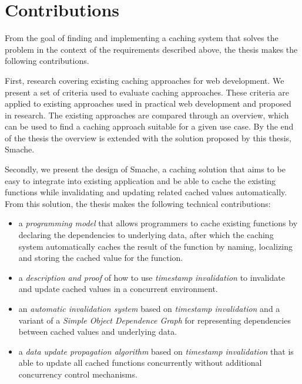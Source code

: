 

\section{Contributions}
\label{sec:contributions}

From the goal of finding and implementing a caching system that solves the problem in the context of the requirements described above, the thesis makes the following contributions.

First, research covering existing caching approaches for web development. We present a set of criteria used to evaluate caching approaches. These criteria are applied to existing approaches used in practical web development and proposed in research. The existing approaches are compared through an overview, which can be used to find a caching approach suitable for a given use case. By the end of the thesis the overview is extended with the solution proposed by this thesis, Smache.

Secondly, we present the design of Smache, a caching solution that aims to be easy to integrate into existing application and be able to cache the existing functions while invalidating and updating related cached values automatically. From this solution, the thesis makes the following technical contributions:

\begin{itemize}
  \item a \emph{programming model} that allows programmers to cache existing functions by declaring the dependencies to underlying data, after which the caching system automatically caches the result of the function by naming, localizing and storing the cached value for the function.
  \item a \emph{description and proof} of how to use \emph{timestamp invalidation} to invalidate and update cached values in a concurrent environment.
  \item an \emph{automatic invalidation system} based on \emph{timestamp invalidation} and a variant of a \emph{Simple Object Dependence Graph} for representing dependencies between cached values and underlying data.
  \item a \emph{data update propagation algorithm} based on \emph{timestamp invalidation} that is able to update all cached functions concurrently without additional concurrency control mechanisms.
\end{itemize}

